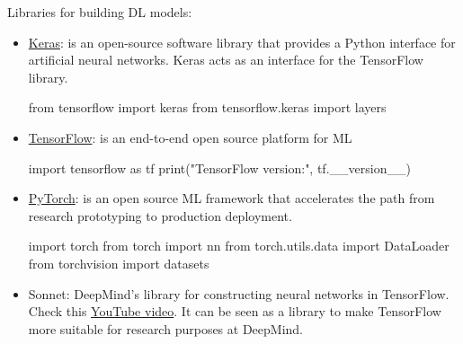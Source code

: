 Libraries for building \ac{DL} models:
\begin{itemize}
	\item \href{https://keras.io/}{Keras}: is an open-source software library that provides a Python interface for artificial neural networks. Keras acts as an interface for the TensorFlow library.
\begin{python}
	from tensorflow import keras
	from tensorflow.keras import layers
\end{python}
	\item \href{https://www.tensorflow.org/overview}{TensorFlow}: is an end-to-end open source platform for \ac{ML}
\begin{python}
	import tensorflow as tf
	print("TensorFlow version:", tf.__version__)
\end{python}
	\item \href{https://pytorch.org/}{PyTorch}: is an open source \ac{ML} framework that accelerates the path from research prototyping to production deployment.
\begin{python}
	import torch
	from torch import nn
	from torch.utils.data import DataLoader
	from torchvision import datasets
\end{python}
	\item Sonnet: DeepMind's library for constructing neural networks in TensorFlow. Check this \href{https://youtu.be/rlpQjnUvoKw}{YouTube video}. It can be seen as a library to make TensorFlow more suitable for research purposes at DeepMind.
\end{itemize}

